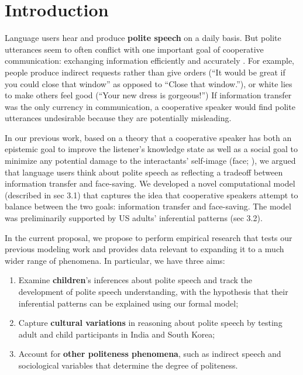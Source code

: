 \section{Introduction}\label{sec:intro}

Language users hear and produce {\bf polite speech} on a daily basis. But polite utterances seem to often conflict with one important goal of cooperative communication: exchanging information efficiently and accurately \citep{Grice1975}. For example, people produce indirect requests rather than give orders (``It would be great if you could close that window'' as opposed to ``Close that window.''), or white lies to make others feel good (``Your new dress is gorgeous!'')  If information transfer was the only currency in communication, a cooperative speaker would find polite utterances undesirable because they are potentially misleading. 

In our previous work, based on a theory that a cooperative speaker has both an epistemic goal to improve the listener's knowledge state as well as a social goal to minimize any potential damage to the interactants' self-image (face; \citealt{Brown1987}), we argued that language users think about polite speech as reflecting a tradeoff between information transfer and face-saving. We developed a novel computational model (described in sec 3.1) that captures the idea that cooperative speakers attempt to balance between the two goals: information transfer and face-saving. The model was preliminarily supported by US adults' inferential patterns (sec 3.2).

In the current proposal, we propose to perform empirical research that tests our previous modeling work and provides data relevant to expanding it to a much wider range of phenomena. In particular, we have three aims:

\begin{enumerate}

\item Examine {\bf children}'s inferences about polite speech and track the development of polite speech understanding, with the hypothesis that their inferential patterns can be explained using our formal model;

\item Capture {\bf cultural variations} in reasoning about polite speech by testing adult and child participants in India and South Korea;

\item Account for {\bf other politeness phenomena}, such as indirect speech and sociological variables that determine the degree of politeness.

\end{enumerate}

